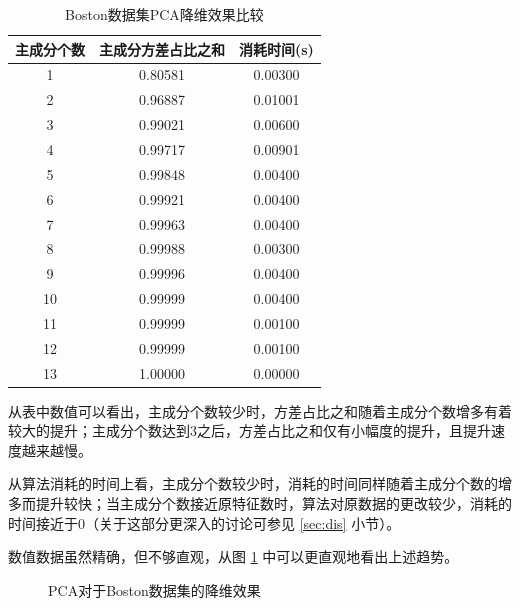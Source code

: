 \documentclass[12pt,a4paper]{article}
\theoremstyle{definition}
\begin{document}
\begin{table}[H]
	\renewcommand\arraystretch{1.35}
	\caption{Boston数据集PCA降维效果比较}
	\label{tab:pca_res_com}
	\centering
	
	\begin{tabular}{c|c|c}
		\centering
		主成分个数 &   主成分方差占比之和 & 消耗时间(s) \\
		\hline
		1 & 0.80581 & 0.00300 \\
		2 & 0.96887 & 0.01001 \\
		3 & 0.99021 & 0.00600 \\
		4 & 0.99717 & 0.00901 \\
		5 & 0.99848 & 0.00400 \\
		6 & 0.99921 & 0.00400 \\
		7 & 0.99963 & 0.00400 \\
		8 & 0.99988 & 0.00300 \\
		9 & 0.99996 & 0.00400 \\
		10 & 0.99999 & 0.00400 \\
		11 & 0.99999 & 0.00100 \\
		12 & 0.99999 & 0.00100 \\
		13 & 1.00000 & 0.00000 \\
	\end{tabular}
\end{table}

从表中数值可以看出，主成分个数较少时，方差占比之和随着主成分个数增多有着较大的提升；主成分个数达到3之后，方差占比之和仅有小幅度的提升，且提升速度越来越慢。

从算法消耗的时间上看，主成分个数较少时，消耗的时间同样随着主成分个数的增多而提升较快；当主成分个数接近原特征数时，算法对原数据的更改较少，消耗的时间接近于0（关于这部分更深入的讨论可参见 \ref{sec:dis} 小节）。

数值数据虽然精确，但不够直观，从图 \ref{fig::kline} 中可以更直观地看出上述趋势。

\begin{figure}[H]
	\centering
	\caption{PCA对于Boston数据集的降维效果}
	\label{fig::kline}
\end{figure}
\end{document}
